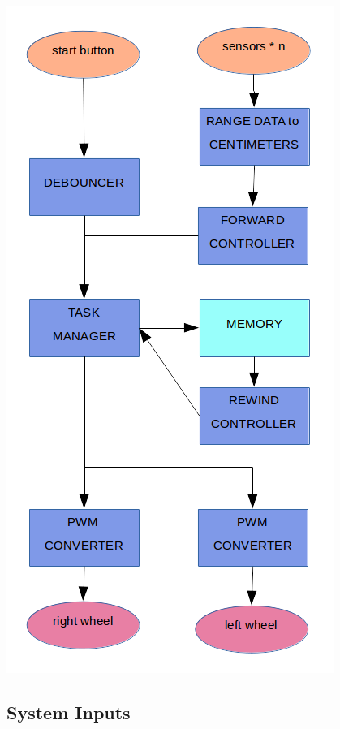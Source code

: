 \documentclass{article}
\begin{document}
\includegraphics[width=\textwidth]{block_diagram.png}

\subsection*{System Inputs}
\end{document}
